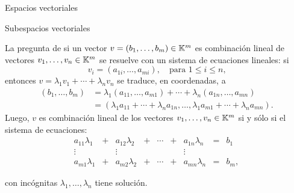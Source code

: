 \begin{chapter}{Espacios vectoriales}
\begin{section}{Subespacios vectoriales}
\begin{observacion*}
    La pregunta de si un vector $v =(b_1,\ldots,b_m) \in \mathbb K^m$ es combinación lineal de vectores $v_1,\ldots,v_n \in \mathbb K^m$ se resuelve con un sistema de ecuaciones lineales: si 
    $$
    v_i = (a_{1i},\ldots,a_{mi}), \quad \text{para $1 \le i \le n$,}
    $$
    entonces $v = \lambda_1v_1 + \cdots +\lambda_nv_n$ se traduce, en coordenadas, a
    \begin{align*}
        (b_1,\ldots,b_m) &= \lambda_1(a_{11},\ldots,a_{m1}) + \cdots +\lambda_n(a_{1n},\ldots,a_{mn}) \\
        &= (\lambda_1a_{11} + \cdots+ \lambda_na_{1n}, \ldots, \lambda_1a_{m1} + \cdots+ \lambda_na_{mn}).
    \end{align*}
    Luego, $v$  es combinación lineal de los vectores $v_1,\ldots,v_n \in \mathbb K^m$ si y sólo si  el sistema de ecuaciones:
    \begin{equation*}
    \begin{matrix}
    a_{11}\lambda_1& + &a_{12}\lambda_2& + &\cdots& + &a_{1n}\lambda_n &= &b_1\\
    \vdots&  &\vdots& &&  &\vdots \\
    a_{m1}\lambda_1& + &a_{m2}\lambda_2& + &\cdots& + &a_{mn}\lambda_n &=&b_m,
    \end{matrix}
    \end{equation*}

    \noindent con incógnitas $\lambda_1,\ldots, \lambda_n$ tiene solución.
\end{observacion*}



\end{section}
\end{chapter}
